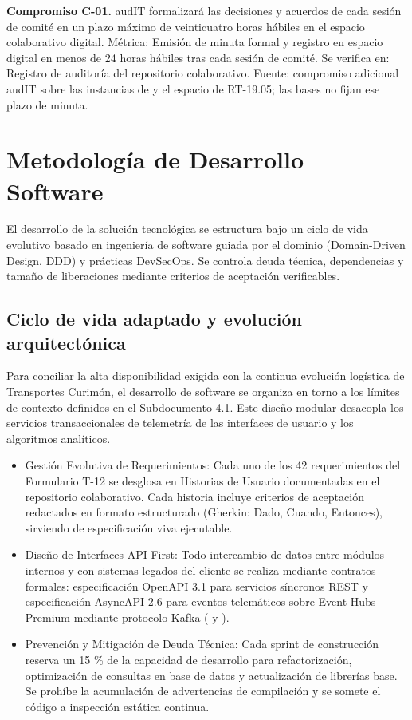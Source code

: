 \textbf{Compromiso C-01.} audIT formalizará las decisiones y acuerdos de cada sesión de comité en un plazo máximo de veinticuatro horas hábiles en el espacio colaborativo digital.  Métrica: Emisión de minuta formal y registro en espacio digital en menos de 24 horas hábiles tras cada sesión de comité. Se verifica en: Registro de auditoría del repositorio colaborativo. Fuente: compromiso adicional audIT sobre las instancias de  y el espacio de RT-19.05; las bases no fijan ese plazo de minuta.

\section{Metodología de Desarrollo Software}\label{sec:6-desarrollo}\label{sec:06-metodologia-de-desarrollo-de-software}

El desarrollo de la solución tecnológica se estructura bajo un ciclo de vida evolutivo basado en ingeniería de software guiada por el dominio (Domain-Driven Design, DDD) y prácticas DevSecOps. Se controla deuda técnica, dependencias y tamaño de liberaciones mediante criterios de aceptación verificables.

\FloatBarrier
\subsection{Ciclo de vida adaptado y evolución arquitectónica}\label{sec:6-desarrollo-ciclovida}\label{sec:06-ciclo-de-vida-adaptado-y-evolucion-arquitectonica}

Para conciliar la alta disponibilidad exigida con la continua evolución logística de Transportes Curimón, el desarrollo de software se organiza en torno a los límites de contexto definidos en el Subdocumento 4.1. Este diseño modular desacopla los servicios transaccionales de telemetría de las interfaces de usuario y los algoritmos analíticos.

\begin{itemize}
\item Gestión Evolutiva de Requerimientos: Cada uno de los 42 requerimientos del Formulario T-12 se desglosa en Historias de Usuario documentadas en el repositorio colaborativo. Cada historia incluye criterios de aceptación redactados en formato estructurado (Gherkin: Dado, Cuando, Entonces), sirviendo de especificación viva ejecutable.
\item Diseño de Interfaces API-First: Todo intercambio de datos entre módulos internos y con sistemas legados del cliente se realiza mediante contratos formales: especificación OpenAPI 3.1 para servicios síncronos REST y especificación AsyncAPI 2.6 para eventos telemáticos sobre Event Hubs Premium mediante protocolo Kafka ( y ).
\item Prevención y Mitigación de Deuda Técnica: Cada sprint de construcción reserva un 15 \% de la capacidad de desarrollo para refactorización, optimización de consultas en base de datos y actualización de librerías base. Se prohíbe la acumulación de advertencias de compilación y se somete el código a inspección estática continua.
\end{itemize}

